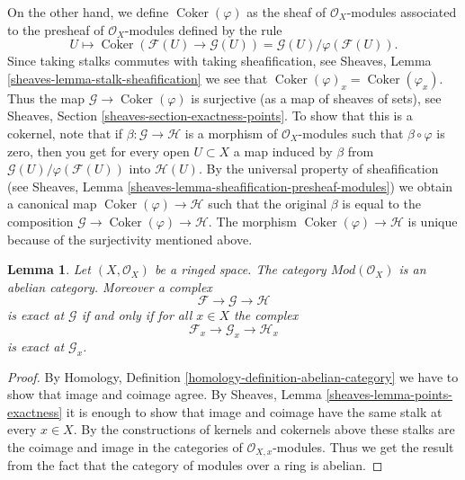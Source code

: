 \documentclass{stacks-project}
\theoremstyle{plain}
\newtheorem{lemma}[subsection]{Lemma}
\theoremstyle{definition}
\theoremstyle{remark}
\numberwithin{equation}{subsection}
\def\Coker{\mathop{\mathrm{Coker}}}
\begin{document}
\medskip\noindent
On the other hand, we define
$\Coker(\varphi)$ as the sheaf of $\mathcal{O}_X$-modules
associated to the presheaf of $\mathcal{O}_X$-modules defined
by the rule
$$
U
\longmapsto
\Coker(\mathcal{F}(U)\to \mathcal{G}(U)) =
\mathcal{G}(U)/\varphi(\mathcal{F}(U)).
$$
Since taking stalks commutes with taking sheafification, see
Sheaves, Lemma \ref{sheaves-lemma-stalk-sheafification} we
see that $\Coker(\varphi)_x = \Coker(\varphi_x)$.
Thus the map $\mathcal{G} \to \Coker(\varphi)$ is surjective
(as a map of sheaves of sets),
see Sheaves, Section \ref{sheaves-section-exactness-points}.
To show that this is a cokernel, note that if
$\beta : \mathcal{G} \to \mathcal{H}$ is a morphism of $\mathcal{O}_X$-modules
such that $\beta \circ \varphi$ is zero, then you get for every
open $U \subset X$ a map induced by $\beta$ from
$\mathcal{G}(U)/\varphi(\mathcal{F}(U))$ into $\mathcal{H}(U)$.
By the universal property of sheafification (see
Sheaves, Lemma \ref{sheaves-lemma-sheafification-presheaf-modules})
we obtain a canonical map $\Coker(\varphi) \to \mathcal{H}$
such that the original $\beta$ is equal to
the composition
$\mathcal{G} \to \Coker(\varphi) \to \mathcal{H}$.
The morphism $\Coker(\varphi) \to \mathcal{H}$ is unique
because of the surjectivity mentioned above.

\begin{lemma}
\label{lemma-abelian}
Let $(X, \mathcal{O}_X)$ be a ringed space. The category
$\textit{Mod}(\mathcal{O}_X)$ is an abelian category. Moreover
a complex
$$
\mathcal{F} \to \mathcal{G} \to \mathcal{H}
$$
is exact at $\mathcal{G}$ if and only if for all $x \in X$ the
complex
$$
\mathcal{F}_x \to \mathcal{G}_x \to \mathcal{H}_x
$$
is exact at $\mathcal{G}_x$.
\end{lemma}

\begin{proof}
By Homology, Definition \ref{homology-definition-abelian-category}
we have to show that image and coimage agree. By Sheaves,
Lemma \ref{sheaves-lemma-points-exactness} it is enough to show
that image and coimage have the same stalk at every $x \in X$.
By the constructions of kernels and cokernels above these stalks
are the coimage and image in the categories of $\mathcal{O}_{X, x}$-modules.
Thus we get the result from the fact that the category of modules
over a ring is abelian.
\end{proof}
\end{document}
